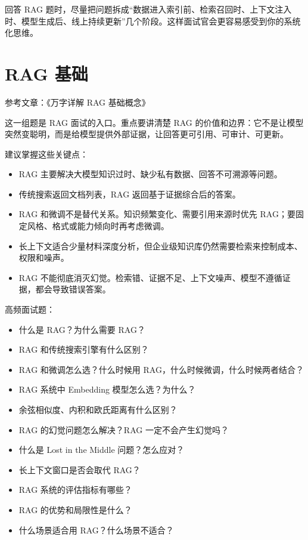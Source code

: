 \documentclass[10pt,a4paper]{ctexart}
\begin{document}
回答 RAG 题时，尽量把问题拆成“数据进入索引前、检索召回时、上下文注入时、模型生成后、线上持续更新”几个阶段。这样面试官会更容易感受到你的系统化思维。



\section{RAG 基础}


参考文章：《万字详解 RAG 基础概念》



这一组题是 RAG 面试的入口。重点要讲清楚 RAG 的价值和边界：它不是让模型突然变聪明，而是给模型提供外部证据，让回答更可引用、可审计、可更新。



建议掌握这些关键点：


\begin{itemize}[itemsep=2pt, topsep=4pt]
  \item RAG 主要解决大模型知识过时、缺少私有数据、回答不可溯源等问题。
  \item 传统搜索返回文档列表，RAG 返回基于证据综合后的答案。
  \item RAG 和微调不是替代关系。知识频繁变化、需要引用来源时优先 RAG；要固定风格、格式或能力倾向时再考虑微调。
  \item 长上下文适合少量材料深度分析，但企业级知识库仍然需要检索来控制成本、权限和噪声。
  \item RAG 不能彻底消灭幻觉。检索错、证据不足、上下文噪声、模型不遵循证据，都会导致错误答案。
\end{itemize}


高频面试题：


\begin{itemize}[itemsep=2pt, topsep=4pt]
  \item 什么是 RAG？为什么需要 RAG？
  \item RAG 和传统搜索引擎有什么区别？
  \item RAG 和微调怎么选？什么时候用 RAG，什么时候微调，什么时候两者结合？
  \item RAG 系统中 Embedding 模型怎么选？为什么？
  \item 余弦相似度、内积和欧氏距离有什么区别？
  \item RAG 的幻觉问题怎么解决？RAG 一定不会产生幻觉吗？
  \item 什么是 Lost in the Middle 问题？怎么应对？
  \item 长上下文窗口是否会取代 RAG？
  \item RAG 系统的评估指标有哪些？
  \item RAG 的优势和局限性是什么？
  \item 什么场景适合用 RAG？什么场景不适合？
\end{itemize}
\end{document}
